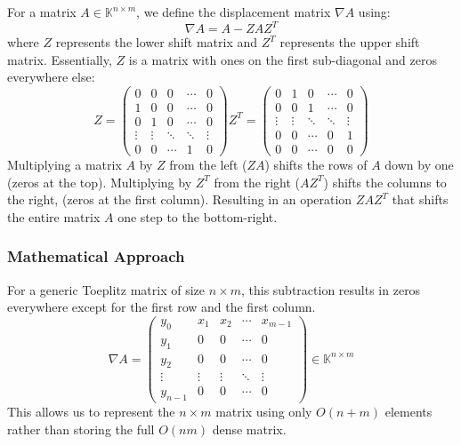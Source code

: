 For a matrix $A \in \mathbb{K}^{n \times m}$, we define the displacement matrix $\nabla A$ using:
\begin{equation}
    \nabla A = A - Z A Z^T
\end{equation}
where $Z$ represents the lower shift matrix and $Z^T$ represents the upper shift matrix.
Essentially, $Z$ is a matrix with ones on the first sub-diagonal and zeros everywhere else:
\begin{equation}
    Z = \begin{pmatrix}
        0      & 0      & 0      & \cdots & 0      \\
        1      & 0      & 0      & \cdots & 0      \\
        0      & 1      & 0      & \cdots & 0      \\
        \vdots & \vdots & \ddots & \ddots & \vdots \\
        0      & 0      & \cdots & 1      & 0
    \end{pmatrix}
    Z^T = \begin{pmatrix}
        0      & 1      & 0      & \cdots & 0      \\
        0      & 0      & 1      & \cdots & 0      \\
        \vdots & \vdots & \ddots & \ddots & \vdots \\
        0      & 0      & \cdots & 0      & 1      \\
        0      & 0      & \cdots & 0      & 0
    \end{pmatrix}
\end{equation}
Multiplying a matrix $A$ by $Z$ from the left ($ZA$) shifts the rows of $A$ down by one (zeros at the top).
Multiplying by $Z^T$ from the right ($AZ^T$) shifts the columns to the right, (zeros at the first column).
Resulting in an operation $ZAZ^T$ that shifts the entire matrix $A$ one step to the bottom-right.

\subsubsection{Mathematical Approach}
For a generic Toeplitz matrix of size $n \times m$, this subtraction results in zeros everywhere except for the first row and the first column.
\begin{equation}
    \nabla A = \begin{pmatrix}
        y_0     & x_1    & x_2    & \cdots & x_{m-1} \\
        y_1     & 0      & 0      & \cdots & 0       \\
        y_2     & 0      & 0      & \cdots & 0       \\
        \vdots  & \vdots & \vdots & \ddots & \vdots  \\
        y_{n-1} & 0      & 0      & \cdots & 0
    \end{pmatrix} \in \mathbb{K}^{n \times m}
\end{equation}
This allows us to represent the $n \times m$ matrix using only $O(n + m)$ elements rather than storing the full $O(nm)$ dense matrix.

